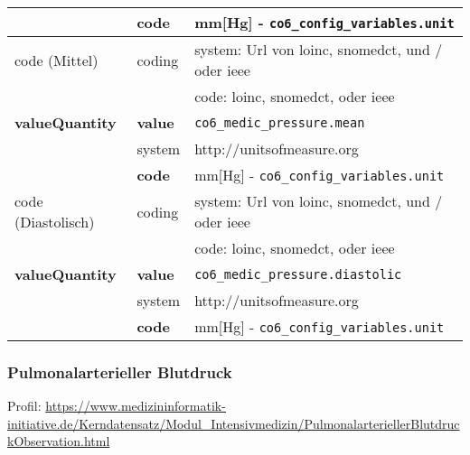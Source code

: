 \begin{longtable}{|l|l|p{7.5cm}|}
	\cline{2-3}
	& \textbf{code} & mm[Hg] - \texttt{co6\_config\_variables.unit} \\ \hline
	code (Mittel)  & coding & system: Url von \ac{loinc}, \ac{snomedct}, und / oder \ac{ieee} \\ 
	\cline{3-3} 
	&  & code: \ac{loinc}, \ac{snomedct}, oder \ac{ieee} \\ \hline	
	\textbf{valueQuantity} & \textbf{value} & \texttt{co6\_medic\_pressure.mean} \\
	\cline{2-3}
	& system & http://unitsofmeasure.org \\ 
	\cline{2-3}
	& \textbf{code} &  mm[Hg] - \texttt{co6\_config\_variables.unit} \\ \hline
	code (Diastolisch)  & coding & system: Url von \ac{loinc}, \ac{snomedct}, und / oder \ac{ieee} \\ 
	\cline{3-3} 
	&  & code: \ac{loinc}, \ac{snomedct}, oder \ac{ieee} \\ \hline	
	\textbf{valueQuantity} & \textbf{value} & \texttt{co6\_medic\_pressure.diastolic} \\
	\cline{2-3}
	& system & http://unitsofmeasure.org \\ 
	\cline{2-3}
	& \textbf{code} & mm[Hg] - \texttt{co6\_config\_variables.unit} \\ \hline
\end{longtable}

\subsubsection{Pulmonalarterieller Blutdruck} 
 Profil: \url{https://www.medizininformatik-initiative.de/Kerndatensatz/Modul_Intensivmedizin/PulmonalarteriellerBlutdruckObservation.html}

